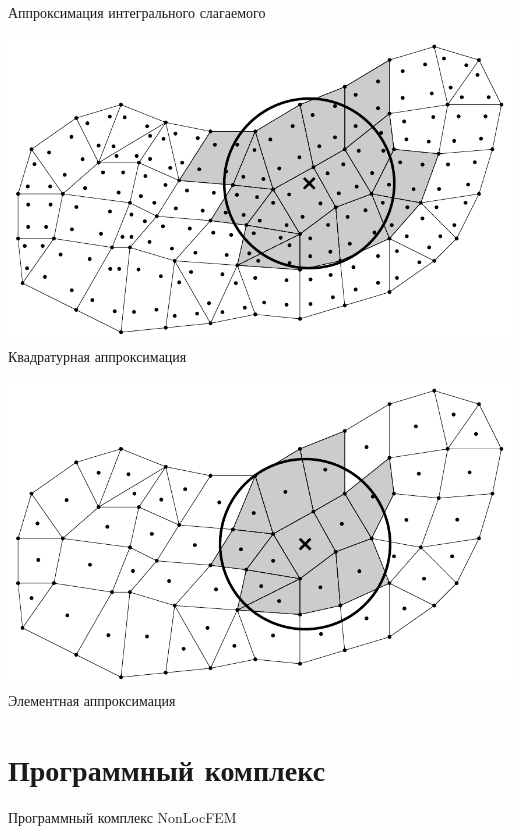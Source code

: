 \begin{frame}{Аппроксимация интегрального слагаемого}
\begin{minipage}[b][][b]{0.49\textwidth}
	\centering
	\includegraphics[width=\textwidth]{pics/ApproxSQ.pdf}
	Квадратурная аппроксимация
\end{minipage}
\hfill
\begin{minipage}[b][][b]{0.49\textwidth}
	\centering
	\includegraphics[width=\textwidth]{pics/ApproxSE.pdf}
	Элементная аппроксимация
\end{minipage}
\end{frame}

\section{Программный комплекс}

\begin{frame}
	\centering
	\Huge
	Программный комплекс NonLocFEM
\end{frame}

